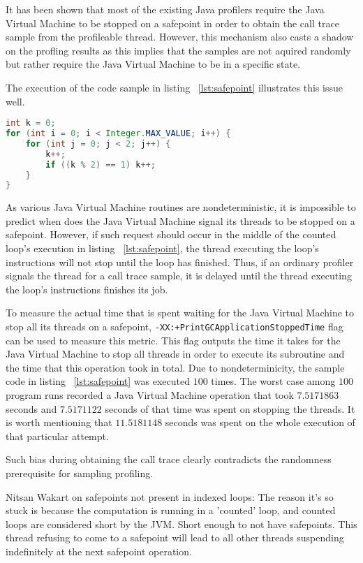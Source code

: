 \documentclass[..thesis.tex]{subfiles}
\begin{document}
 
It has been shown that most of the existing Java profilers require the Java Virtual Machine to be stopped on a safepoint in order to obtain the call trace sample from the profileable thread. However, this mechanism also casts a shadow on the profling results as this implies that the samples are not aquired randomly but rather require the Java Virtual Machine to be in a specific state. \cite{mytkowicz_evaluating_2010}

The execution of the code sample in listing ~\ref{lst:safepoint} illustrates this issue well. 
\begin{lstlisting}[language=java,style=def,label={lst:safepoint}, caption={Counted loops do not contain safepoints}]
int k = 0;
for (int i = 0; i < Integer.MAX_VALUE; i++) {
	for (int j = 0; j < 2; j++) {
    	k++;
    	if ((k % 2) == 1) k++;
	}
}
\end{lstlisting}
As various Java Virtual Machine routines are nondeterministic, it is impossible to predict when does the Java Virtual Machine signal its threads to be stopped on a safepoint. However, if such request should occur in the middle of the counted loop's execution in listing ~\ref{lst:safepoint}, the thread executing the loop's instructions will not stop until the loop has finished. Thus, if an ordinary profiler signals the thread for a call trace sample, it is delayed until the thread executing the loop's instructions finishes its job. 

To measure the actual time that is spent waiting for the Java Virtual Machine to stop all its threads on a safepoint, \texttt{-XX:+PrintGCApplicationStoppedTime} flag can be used to measure this metric. This flag outputs the time it takes for the Java Virtual Machine to stop all threads in order to execute its subroutine and the time that this operation took in total. Due to nondeterminicity, the sample code in listing ~\ref{lst:safepoint} was executed $100$ times. The worst case among $100$ program runs recorded a Java Virtual Machine operation that took $7.5171863$ seconds and $7.5171122$ seconds of that time was spent on stopping the threads. It is worth mentioning that $11.5181148$ seconds was spent on the whole execution of that particular attempt.



Such bias during obtaining the call trace clearly contradicts the randomness prerequisite for sampling profiling.




Nitsan Wakart on safepoints not present in indexed loops: The reason it's so stuck is because the computation is running in a 'counted' loop, and counted loops are considered short by the JVM. Short enough to not have safepoints. This thread refusing to come to a safepoint will lead to all other threads suspending indefinitely at the next safepoint operation.
\end{document}
